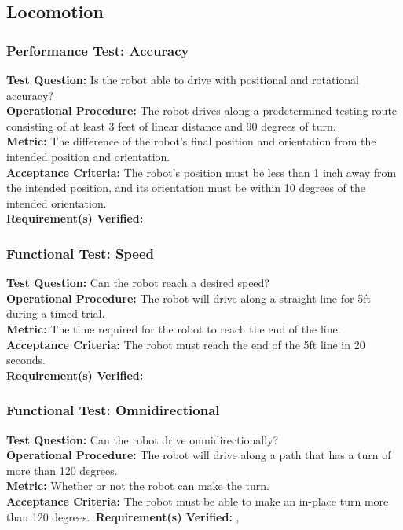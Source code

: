 
\subsection{Locomotion}
\label{sec:verification_locomotion}

\subsubsection{Performance Test: Accuracy}
\label{test:locomotion_pt_accuracy}
\textbf{Test Question:} Is the robot able to drive with positional and rotational accuracy?\\
\textbf{Operational Procedure:} The robot drives along a predetermined testing route consisting of at least 3 feet of linear distance and 90 degrees of turn.\\
\textbf{Metric:} The difference of the robot's final position and orientation from the intended position and orientation. \\
\textbf{Acceptance Criteria:} The robot's position must be less than 1 inch away from the intended position, and its orientation must be within 10 degrees of the intended orientation.\\
\textbf{Requirement(s) Verified:} 

\subsubsection{Functional Test: Speed}
\label{test:locomotion_ft_speed}
\textbf{Test Question:} Can the robot reach a desired speed? \\
\textbf{Operational Procedure:} The robot will drive along a straight line for 5ft during a timed trial.\\
\textbf{Metric:} The time required for the robot to reach the end of the line.\\
\textbf{Acceptance Criteria:} The robot must reach the end of the 5ft line in 20 seconds. \\
\textbf{Requirement(s) Verified:} 

\subsubsection{Functional Test: Omnidirectional}
\label{test:locomotion_ft_omni}
\textbf{Test Question:} Can the robot drive omnidirectionally? \\
\textbf{Operational Procedure:} The robot will drive along a path that has a turn of more than 120 degrees.\\
\textbf{Metric:} Whether or not the robot can make the turn.\\
\textbf{Acceptance Criteria:} The robot must be able to make an in-place turn more than 120 degrees.\
\textbf{Requirement(s) Verified:} , 

